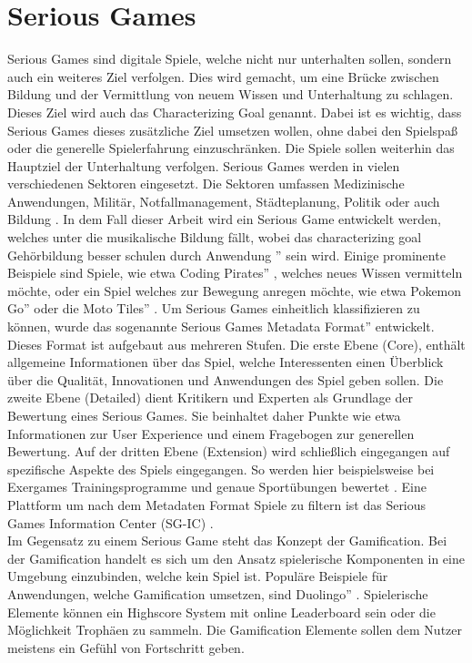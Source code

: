 \section{Serious Games}
Serious Games sind digitale Spiele, welche nicht nur unterhalten sollen, sondern auch ein weiteres Ziel verfolgen. Dies wird gemacht, um eine Brücke zwischen Bildung und der Vermittlung von neuem Wissen und Unterhaltung zu schlagen. Dieses Ziel wird auch das Characterizing Goal genannt. Dabei ist es wichtig, dass Serious Games dieses zusätzliche Ziel umsetzen wollen, ohne dabei den Spielspaß oder die generelle Spielerfahrung einzuschränken. Die Spiele sollen weiterhin das Hauptziel der Unterhaltung verfolgen. Serious Games werden in vielen verschiedenen Sektoren eingesetzt. Die Sektoren umfassen Medizinische Anwendungen, Militär, Notfallmanagement, Städteplanung, Politik oder auch Bildung \cite{gaiasg}. In dem Fall dieser Arbeit wird ein Serious Game entwickelt werden, welches unter die musikalische Bildung fällt, wobei das characterizing goal \glqq Gehörbildung besser schulen durch Anwendung '' sein wird. 
Einige prominente Beispiele sind Spiele, wie etwa \glqq Coding Pirates'' \cite{coding_game}, welches neues Wissen vermitteln möchte, oder ein Spiel welches zur Bewegung anregen möchte, wie etwa \glqq Pokemon Go''\cite{althoff2016influence} oder die \glqq Moto Tiles'' \cite{liu2018playful}. Um Serious Games einheitlich klassifizieren zu können, wurde das sogenannte \glqq Serious Games Metadata Format'' entwickelt. Dieses Format ist aufgebaut aus mehreren Stufen. Die erste Ebene (Core), enthält allgemeine Informationen über das Spiel, welche Interessenten einen Überblick über die Qualität, Innovationen und Anwendungen des Spiel geben sollen. Die zweite Ebene (Detailed) dient Kritikern und Experten als Grundlage der Bewertung eines Serious Games. Sie beinhaltet daher Punkte wie etwa Informationen zur User Experience und einem Fragebogen zur generellen Bewertung. Auf der dritten Ebene (Extension) wird schließlich eingegangen auf spezifische Aspekte des Spiels eingegangen. So werden hier beispielsweise bei Exergames Trainingsprogramme und genaue Sportübungen bewertet \cite{gobel2011makes}. Eine Plattform um nach dem Metadaten Format Spiele zu filtern ist das Serious Games Information Center (SG-IC) \cite{sg_ic}. \\
Im Gegensatz zu einem Serious Game steht das Konzept der Gamification. Bei der Gamification handelt es sich um den Ansatz spielerische Komponenten in eine Umgebung einzubinden, welche kein Spiel ist. Populäre Beispiele für Anwendungen, welche Gamification umsetzen, sind \glqq Duolingo'' \cite{duolingo}. Spielerische Elemente können ein Highscore System mit online Leaderboard sein oder die Möglichkeit Trophäen zu sammeln. Die Gamification Elemente sollen dem Nutzer meistens ein Gefühl von Fortschritt geben. 

